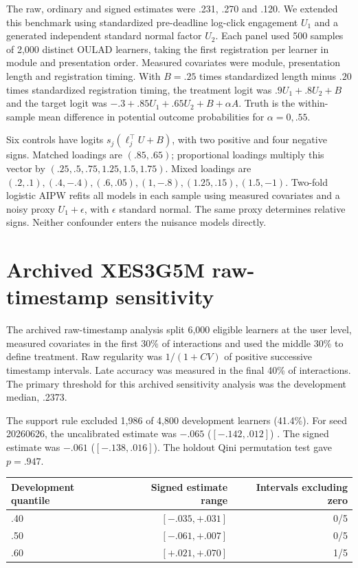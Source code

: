 The raw, ordinary and signed estimates were .231, .270 and .120. We extended this benchmark using standardized pre-deadline log-click engagement $U_1$ and a generated independent standard normal factor $U_2$. Each panel used 500 samples of 2,000 distinct OULAD learners, taking the first registration per learner in module and presentation order. Measured covariates were module, presentation length and registration timing. With $B=.25$ times standardized length minus $.20$ times standardized registration timing, the treatment logit was $.9U_1+.8U_2+B$ and the target logit was $-.3+.85U_1+.65U_2+B+\alpha A$. Truth is the within-sample mean difference in potential outcome probabilities for $\alpha=0,.55$.

Six controls have logits $s_j(\ell_j^\top U+B)$, with two positive and four negative signs. Matched loadings are $(.85,.65)$; proportional loadings multiply this vector by $(.25,.5,.75,1.25,1.5,1.75)$. Mixed loadings are $(.2,.1),(.4,-.4),(.6,.05),(1,-.8),(1.25,.15),(1.5,-1)$. Two-fold logistic AIPW refits all models in each sample using measured covariates and a noisy proxy $U_1+\epsilon$, with $\epsilon$ standard normal. The same proxy determines relative signs. Neither confounder enters the nuisance models directly.



\clearpage
\section{Archived XES3G5M raw-timestamp sensitivity}

The archived raw-timestamp analysis split 6,000 eligible learners at the user level, measured covariates in the first 30\% of interactions and used the middle 30\% to define treatment. Raw regularity was $1/(1+CV)$ of positive successive timestamp intervals. Late accuracy was measured in the final 40\% of interactions. The primary threshold for this archived sensitivity analysis was the development median, .2373.

The support rule excluded 1,986 of 4,800 development learners (41.4\%). For seed 20260626, the uncalibrated estimate was $-.065$ ($[-.142,.012]$)  . The signed estimate was $-.061$ ($[-.138,.016]$). The holdout Qini permutation test gave $p=.947$.

\begin{center}\small
\begin{tabular}{lrr}
\toprule
Development quantile & Signed estimate range & Intervals excluding zero\\
\midrule
.40 & $[-.035,+.031]$ & 0/5\\
.50 & $[-.061,+.007]$ & 0/5\\
.60 & $[+.021,+.070]$ & 1/5\\
\bottomrule
\end{tabular}
\end{center}

